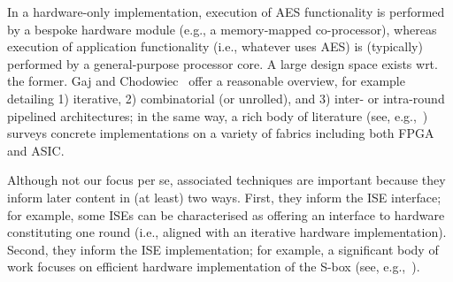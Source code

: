 
In a hardware-only implementation,
execution of 
AES         functionality
is 
performed by 
a bespoke hardware module (e.g., a memory-mapped co-processor),
whereas
execution of 
application functionality (i.e., whatever uses AES)
is (typically)
performed by 
a general-purpose processor core.
A large design space exists wrt. the former.
Gaj and Chodowiec~\cite[Section 3.3]{GajCho:00}
offer a reasonable overview, for example detailing
1) iterative,
2) combinatorial
   (or unrolled),
   and
3) inter- or intra-round
   pipelined
architectures; in the same way, a rich body of literature
(see, e.g.,~\cite{PMDW:04,GooBen:05,GajCho:09})
surveys concrete implementations on a variety of fabrics including both FPGA 
and ASIC.

Although not our focus per se, associated techniques are important because
they inform later content in (at least) two ways.
First,
they inform the ISE interface;
for example, some ISEs can be characterised as offering an interface to
hardware constituting one round 
(i.e., aligned with an iterative hardware implementation).
Second,
they inform the ISE implementation;
for example, a significant body of work focuses on efficient hardware 
implementation of the S-box
(see, e.g.,~\cite{Canright:05,BoyPer:12,ReyTahAsh:18}).

